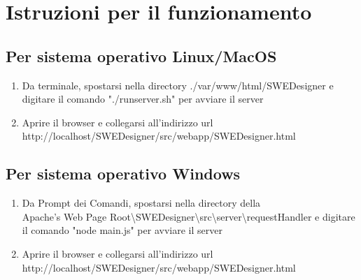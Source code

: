 \documentclass[../ManualeUtente.tex]{subfiles}
\begin{document}
	\section{Istruzioni per il funzionamento}\label{sez:funcIstr}
		\subsection{Per sistema operativo Linux/MacOS}
		 	\begin{enumerate}
		 		\item Da terminale, spostarsi nella directory ./var/www/html/SWEDesigner e digitare il comando
		 		"./runserver.sh" per avviare il server
	 			\item Aprire il browser e collegarsi all'indirizzo url\\
	 			http://localhost/SWEDesigner/src/webapp/SWEDesigner.html
		 	\end{enumerate}
		\subsection{Per sistema operativo Windows}
			\begin{enumerate}
		 		\item Da Prompt dei Comandi, spostarsi nella directory della\\
		 		Apache's Web Page Root\textbackslash SWEDesigner\textbackslash src\textbackslash server\textbackslash requestHandler e digitare il comando "node main.js"
		 		per avviare il server
		 		\item Aprire il browser e collegarsi all'indirizzo url\\
		 		http://localhost/SWEDesigner/src/webapp/SWEDesigner.html
		 	\end{enumerate}
\end{document}
